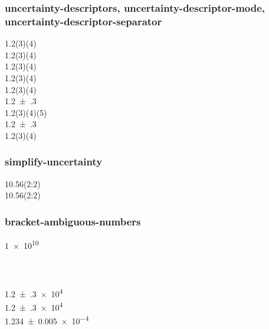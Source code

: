 \documentclass{article}
\begin{document}
\subsubsection{uncertainty-descriptors, uncertainty-descriptor-mode, uncertainty-descriptor-separator} %
{
\num{1.2(3)(4)} \\
\num{1.2(3)(4)} \\ %
\num[uncertainty-descriptor-mode = subscript]{1.2(3)(4)}\\
\num[uncertainty-descriptor-mode = bracket]{1.2(3)(4)}\\
\num[uncertainty-descriptor-mode = separator]{1.2(3)(4)}\\
\num[uncertainty-mode=separate]{1.2(3)}\\
\num[uncertainty-mode=separate]{1.2(3)(4)(5)}\\
}
\num[uncertainty-mode=separate, uncertainty-descriptors={sys}]{1.2(3)}\\
\num[uncertainty-mode=separate, uncertainty-descriptors={sys,stat,third}]{1.2(3)(4)}

\subsubsection{simplify-uncertainty}
\num{10.56(2:2)} \\
\num[simplify-uncertainty]{10.56(2:2)}

\subsubsection{bracket-ambiguous-numbers}
\num{1 e10} \\
 \\
 \\
 \\
{
\num{1.2(3)e4} \\
\num[bracket-ambiguous-numbers = false]{1.2(3)e4} \\
}
{
%
\num{1.234(5)e-4} %
}
\end{document}
